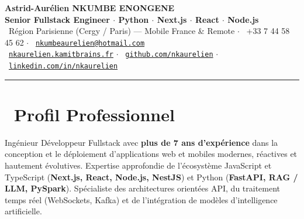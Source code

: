 \documentclass[10pt,a4paper]{article}
\begin{document}
\begin{center}
    {\LARGE\bfseries\color{primary} Astrid-Aurélien NKUMBE ENONGENE}\\[0.25em]
    {\large\bfseries\color{darkgray} Senior Fullstack Engineer $\cdot$ Python $\cdot$ Next.js $\cdot$ React $\cdot$ Node.js}\\[0.4em]
    {\footnotesize\color{slateGray}
        \faMapMarker*\ Région Parisienne (Cergy / Paris) --- Mobile France \& Remote \quad$\cdot$\quad
        \faPhone*\ +33 7 44 58 45 62 \quad$\cdot$\quad
        \faEnvelope\ \href{mailto:nkumbeaurelien@hotmail.com}{\texttt{nkumbeaurelien@hotmail.com}}\\[0.25em]
        \faGlobe\ \href{https://nkaurelien.kamitbrains.fr}{\texttt{nkaurelien.kamitbrains.fr}} \quad$\cdot$\quad
        \faGithub\ \href{https://github.com/nkaurelien}{\texttt{github.com/nkaurelien}} \quad$\cdot$\quad
        \faLinkedin\ \href{https://www.linkedin.com/in/nkaurelien/}{\texttt{linkedin.com/in/nkaurelien}}
    }
\end{center}

\vspace{0.1em}
\textcolor{ruleGray}{\rule{\linewidth}{1pt}}
\vspace{0.35em}

\section{\faLightbulb\ Profil Professionnel}
Ingénieur Développeur Fullstack avec \textbf{plus de 7 ans d'expérience} dans la conception et le déploiement d'applications web et mobiles modernes, réactives et hautement évolutives. Expertise approfondie de l'écosystème JavaScript et TypeScript (\textbf{Next.js, React, Node.js, NestJS}) et Python (\textbf{FastAPI, RAG / LLM, PySpark}). Spécialiste des architectures orientées API, du traitement temps réel (WebSockets, Kafka) et de l'intégration de modèles d'intelligence artificielle.

\end{document}
